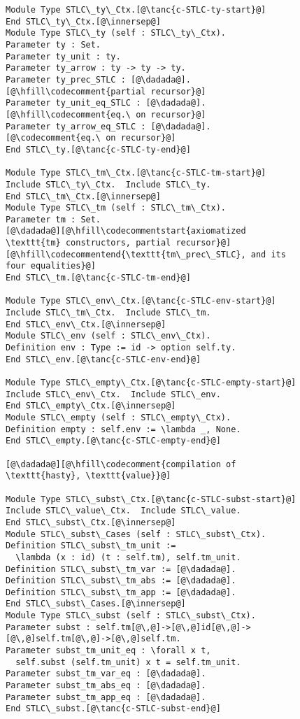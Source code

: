 \begin{figure}
\begin{minipage}{\textwidth}
\begin{multicols}{2}



\newcommand{\innersep}{\vspace{5pt}}

\begin{lstlisting}
Module Type STLC\_ty\_Ctx.[@\tanc{c-STLC-ty-start}@]
End STLC\_ty\_Ctx.[@\innersep@]
Module Type STLC\_ty (self : STLC\_ty\_Ctx).
Parameter ty : Set.
Parameter ty_unit : ty.
Parameter ty_arrow : ty -> ty -> ty.
Parameter ty_prec_STLC : [@\dadada@].[@\hfill\codecomment{partial recursor}@]
Parameter ty_unit_eq_STLC : [@\dadada@].[@\hfill\codecomment{eq.\ on recursor}@]
Parameter ty_arrow_eq_STLC : [@\dadada@].[@\codecomment{eq.\ on recursor}@]
End STLC\_ty.[@\tanc{c-STLC-ty-end}@]

Module Type STLC\_tm\_Ctx.[@\tanc{c-STLC-tm-start}@]
Include STLC\_ty\_Ctx.  Include STLC\_ty.
End STLC\_tm\_Ctx.[@\innersep@]
Module Type STLC\_tm (self : STLC\_tm\_Ctx).
Parameter tm : Set.
[@\dadada@][@\hfill\codecommentstart{axiomatized \texttt{tm} constructors, partial recursor}@]
[@\hfill\codecommentend{\texttt{tm\_prec\_STLC}, and its four equalities}@]
End STLC\_tm.[@\tanc{c-STLC-tm-end}@]

Module Type STLC\_env\_Ctx.[@\tanc{c-STLC-env-start}@]
Include STLC\_tm\_Ctx.  Include STLC\_tm.
End STLC\_env\_Ctx.[@\innersep@]
Module STLC\_env (self : STLC\_env\_Ctx).
Definition env : Type := id -> option self.ty.
End STLC\_env.[@\tanc{c-STLC-env-end}@]

Module Type STLC\_empty\_Ctx.[@\tanc{c-STLC-empty-start}@]
Include STLC\_env\_Ctx.  Include STLC\_env.
End STLC\_empty\_Ctx.[@\innersep@]
Module STLC\_empty (self : STLC\_empty\_Ctx).
Definition empty : self.env := \lambda _, None.
End STLC\_empty.[@\tanc{c-STLC-empty-end}@]

[@\dadada@][@\hfill\codecomment{compilation of \texttt{hasty}, \texttt{value}}@]

Module Type STLC\_subst\_Ctx.[@\tanc{c-STLC-subst-start}@]
Include STLC\_value\_Ctx.  Include STLC\_value.
End STLC\_subst\_Ctx.[@\innersep@]
Module STLC\_subst\_Cases (self : STLC\_subst\_Ctx).
Definition STLC\_subst\_tm_unit :=
  \lambda (x : id) (t : self.tm), self.tm_unit.
Definition STLC\_subst\_tm_var := [@\dadada@].
Definition STLC\_subst\_tm_abs := [@\dadada@].
Definition STLC\_subst\_tm_app := [@\dadada@].
End STLC\_subst\_Cases.[@\innersep@]
Module Type STLC\_subst (self : STLC\_subst\_Ctx).
Parameter subst : self.tm[@\,@]->[@\,@]id[@\,@]->[@\,@]self.tm[@\,@]->[@\,@]self.tm.
Parameter subst_tm_unit_eq : \forall x t,
  self.subst (self.tm_unit) x t = self.tm_unit.
Parameter subst_tm_var_eq : [@\dadada@].
Parameter subst_tm_abs_eq : [@\dadada@].
Parameter subst_tm_app_eq : [@\dadada@].
End STLC\_subst.[@\tanc{c-STLC-subst-end}@]


\end{lstlisting}
\end{multicols}
\end{minipage}
\end{figure}
